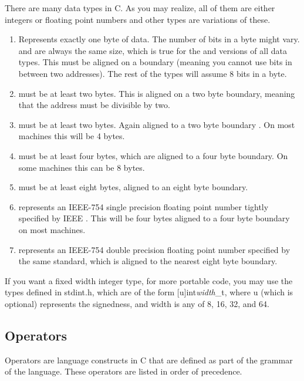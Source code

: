 There are many data types in C.
As you may realize, all of them are either integers or floating point numbers and other types are variations of these.

\begin{enumerate}
\item {} Represents exactly one byte of data.
  The number of bits in a byte might vary.
   and  are always the same size, which is true for the  and  versions of all data types.
  This must be aligned on a boundary (meaning you cannot use bits in between two addresses).
  The rest of the types will assume 8 bits in a byte.
\item {} must be at least two bytes.
  This is aligned on a two byte boundary, meaning that the address must be divisible by two.
\item {} must be at least two bytes.
  Again aligned to a two byte boundary \cite[P.
    34]{ISON1124}. On most machines this will be 4 bytes.
\item {} must be at least four bytes, which are aligned to a four byte boundary.
  On some machines this can be 8 bytes.
	\item {} must be at least eight bytes, aligned to an eight byte boundary.
	\item {} represents an IEEE-754 single precision floating point number tightly specified by IEEE \cite{4610935}.
    This will be four bytes aligned to a four byte boundary on most machines.
	\item {} represents an IEEE-754 double precision floating point number specified by the same standard, which is aligned to the nearest eight byte boundary.
\end{enumerate}

If you want a fixed width integer type, for more portable code, you may use the types defined in stdint.h, which are of the form [u]int\emph{width}\_t, where u (which is optional) represents the signedness, and width is any of 8, 16, 32, and 64.

\subsection{Operators}

Operators are language constructs in C that are defined as part of the grammar of the language.
These operators are listed in order of precedence.

